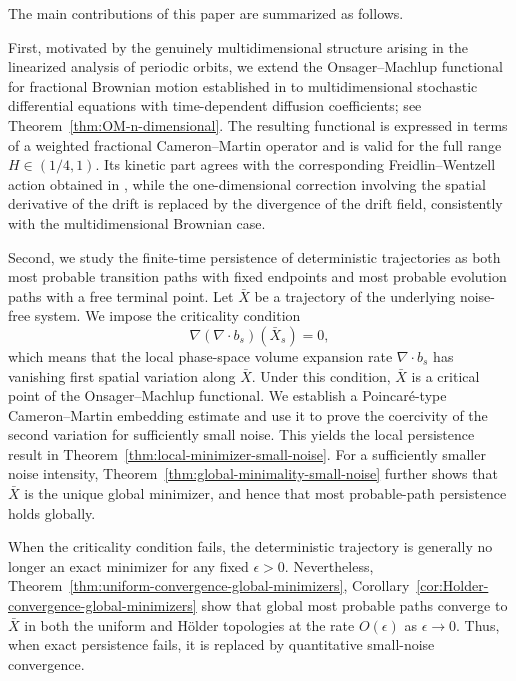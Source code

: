 \documentclass[preprint,12pt]{elsarticle}
\theoremstyle{definition}
\theoremstyle{plain}
\begin{document}
The main contributions of this paper are summarized as follows.

First, motivated by the genuinely multidimensional structure arising in the
linearized analysis of periodic orbits, we extend the Onsager--Machlup
functional for fractional Brownian motion established in \cite{Nualart} to
multidimensional stochastic differential equations with time-dependent
diffusion coefficients; see
Theorem~\ref{thm:OM-n-dimensional}. The resulting functional is expressed in
terms of a weighted fractional Cameron--Martin operator and is valid for the
full range $H\in(1/4,1)$. Its kinetic part agrees with the corresponding
Freidlin--Wentzell action obtained in \cite{FanYuYuan2023}, while the
one-dimensional correction involving the spatial derivative of the drift is
replaced by the divergence of the drift field, consistently with the
multidimensional Brownian case.

Second, we study the finite-time persistence of deterministic trajectories
as both most probable transition paths with fixed endpoints and most probable
evolution paths with a free terminal point. Let $\bar X$ be a trajectory of
the underlying noise-free system. We impose the criticality condition
\begin{equation*}
    \nabla(\nabla\cdot b_s)(\bar X_s)=0,
\end{equation*}
which means that the local phase-space volume expansion rate
$\nabla\cdot b_s$ has vanishing first spatial variation along $\bar X$.
Under this condition, $\bar X$ is a critical point of the
Onsager--Machlup functional. We establish a Poincar\'e-type
Cameron--Martin embedding estimate and use it to prove the coercivity of
the second variation for sufficiently small noise. This yields the local
persistence result in
Theorem~\ref{thm:local-minimizer-small-noise}. For a sufficiently smaller noise intensity,
Theorem~\ref{thm:global-minimality-small-noise} further shows that
$\bar X$ is the unique global minimizer, and hence that most
probable-path persistence holds globally.

When the criticality condition fails, the deterministic trajectory is
generally no longer an exact minimizer for any fixed $\epsilon>0$.
Nevertheless,
Theorem~\ref{thm:uniform-convergence-global-minimizers},
Corollary~\ref{cor:Holder-convergence-global-minimizers} show that global most probable paths
converge to $\bar X$ in both the uniform and H\"older topologies at the rate
$O(\epsilon)$ as $\epsilon\to0$. Thus, when exact persistence fails, it is
replaced by quantitative small-noise convergence.
\end{document}
